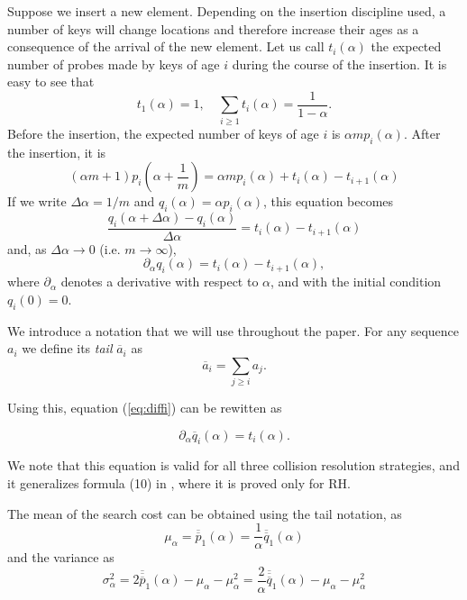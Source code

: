 \documentclass[proceedings]{aofa}
\newcommand{\tail}[1]{\overline{#1}}
\newcommand{\ttail}[1]{\tail{\tail{#1}}}
\newcommand{\tttail}[1]{\tail{\ttail{#1}}}
\begin{document}
Suppose we insert a new element.
Depending on the insertion discipline used, a number of keys will change
locations and therefore increase their ages as a consequence of the arrival of the new element.
Let us call $t_i(\alpha)$ the expected number of probes made by keys of age $i$ during the course of the insertion.
It is easy to see that
\begin{equation}
t_1(\alpha) = 1, \quad
\sum_{i\ge 1} t_i(\alpha) =\frac {1}{1-\alpha}.
\end{equation}
Before the insertion, the expected number of keys of age $i$ is
$\alpha m p_i(\alpha)$.
After the insertion, it is
\begin{equation}\label{eq:ins}
(\alpha m+1)p_i(\alpha+\frac{1}{m}) =
\alpha m p_i(\alpha) + t_i(\alpha) - t_{i+1}(\alpha)
\end{equation}
If we write $\Delta\alpha = 1/m$ and $q_i(\alpha)=\alpha p_i(\alpha)$, this equation becomes
\begin{equation}
\frac{q_i(\alpha+\Delta\alpha)-q_i(\alpha)}{\Delta\alpha}
= t_i(\alpha) - t_{i+1}(\alpha)
\end{equation}
and, as $\Delta\alpha \rightarrow 0$ (i.e. $m \rightarrow \infty$),
\begin{equation}
\label{eq:diffi}
\partial_{\alpha}q_i(\alpha) = t_i(\alpha) - t_{i+1}(\alpha),
\end{equation}
where $\partial_{\alpha}$ denotes a derivative with respect to $\alpha$, and with the initial condition $q_i(0)=0$.

We introduce a notation that we will use throughout the paper. For any sequence $a_i$ we define its {\em tail} $\tail{a}_i$ as
\begin{equation}
\tail{a}_i = \sum_{j \ge i} a_j.
\end{equation}

Using this, equation (\ref{eq:diffi}) can be rewitten as

\begin{equation}
\label{eq:diffi1}
\partial_{\alpha} \tail{q}_i(\alpha) = t_i(\alpha).
\end{equation}

We note that this equation is valid for all three
collision resolution strategies, and it generalizes
formula (10) in \cite{Mit}, where it is proved only
for RH.

The mean of the search cost can be obtained using the tail notation, as
\begin{equation}\label{eq:tailE}
\mu_{\alpha}=\ttail{p}_1(\alpha)=\frac{1}{\alpha}\ttail{q}_1(\alpha)
\end{equation}
and the variance as
\begin{equation}\label{eq:tailV}
\sigma_{\alpha}^2 = 2\tttail{p}_1(\alpha) - \mu_{\alpha} - \mu_{\alpha}^2
= \frac{2}{\alpha} \tttail{q}_1(\alpha) - \mu_{\alpha} - \mu_{\alpha}^2
\end{equation}
\end{document}
